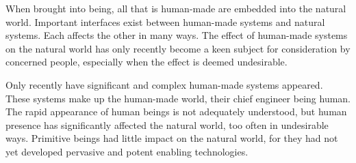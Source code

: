 When brought into being, all that is human-made are embedded into the natural world. Important interfaces exist between human-made systems and natural systems. Each affects the other in many ways. The effect of human-made systems on the natural world has only recently become a keen subject for consideration by concerned people, especially when the effect is deemed undesirable.

Only recently have significant and complex human-made systems appeared. These systems make up the human-made world, their chief engineer being human. The rapid appearance of human beings is not adequately understood, but human presence has significantly affected the natural world, too often in undesirable ways. Primitive beings had little impact on the natural world, for they had not yet developed pervasive and potent enabling technologies.
